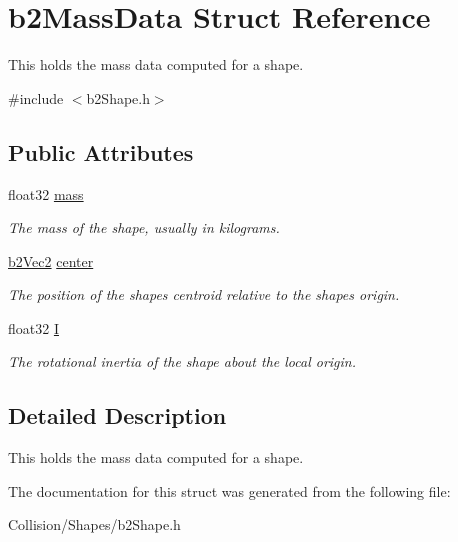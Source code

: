 \hypertarget{structb2MassData}{}\section{b2\+Mass\+Data Struct Reference}
\label{structb2MassData}


This holds the mass data computed for a shape.  




{\ttfamily \#include $<$b2\+Shape.\+h$>$}

\subsection*{Public Attributes}
\begin{DoxyCompactItemize}
\item 
\mbox{\label{structb2MassData_aea85d9595a38d2eed05b8d2ea80d97b1}} 
float32 \mbox{\hyperlink{structb2MassData_aea85d9595a38d2eed05b8d2ea80d97b1}{mass}}
\begin{DoxyCompactList}\small\item\em The mass of the shape, usually in kilograms. \end{DoxyCompactList}\item 
\mbox{\label{structb2MassData_a1d59bebc7030c4dded0c2febc57ebdd7}} 
\mbox{\hyperlink{structb2Vec2}{b2\+Vec2}} \mbox{\hyperlink{structb2MassData_a1d59bebc7030c4dded0c2febc57ebdd7}{center}}
\begin{DoxyCompactList}\small\item\em The position of the shape\textquotesingle{}s centroid relative to the shape\textquotesingle{}s origin. \end{DoxyCompactList}\item 
\mbox{\label{structb2MassData_ad2d06e96e2d79d895df16ae0e5fe0376}} 
float32 \mbox{\hyperlink{structb2MassData_ad2d06e96e2d79d895df16ae0e5fe0376}{I}}
\begin{DoxyCompactList}\small\item\em The rotational inertia of the shape about the local origin. \end{DoxyCompactList}\end{DoxyCompactItemize}


\subsection{Detailed Description}
This holds the mass data computed for a shape. 

The documentation for this struct was generated from the following file\+:\begin{DoxyCompactItemize}
\item 
Collision/\+Shapes/b2\+Shape.\+h\end{DoxyCompactItemize}
